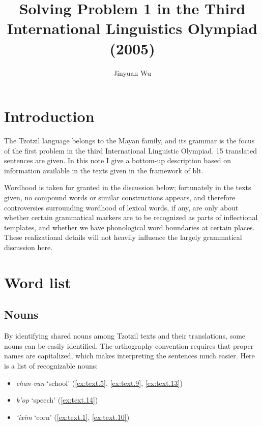 \documentclass[12pt]{article}
\title{Solving Problem 1 in the Third International Linguistics Olympiad (2005)}
\author{Jinyuan Wu}
\newcommand*{\form}[1]{\emph{#1}}
\newcommand{\translate}[1]{`#1'}
\begin{document}
\automath

\maketitle

\section{Introduction}

The Tzotzil language belongs to the Mayan family,
and its grammar is the focus of the first problem 
in the third International Linguistic Olympiad.
15 translated sentences are given.
In this note I give a bottom-up description 
based on information available in the texts given
in the framework of \ac{blt}.

Wordhood is taken for granted in the discussion below;
fortunately in the texts given,
no compound words or similar constructions appears, 
and therefore controversies surrounding wordhood of lexical words, 
if any, are only about whether certain grammatical markers 
are to be recognized as parts of inflectional templates,
and whether we have phonological word boundaries at certain places.
These realizational details will not heavily influence the largely grammatical discussion here. 

\section{Word list}

\subsection{Nouns}

By identifying shared nouns among Tzotzil texts and their translations,
some nouns can be easily identified.
The orthography convention 
requires that proper names are capitalized,
which makes interpreting the sentences much easier.
Here is a list of recognizable nouns:
\begin{itemize}
    \item \form{chan-vun} \translate{school} (\ref{ex:text.5}, \ref{ex:text.9}, \ref{ex:text.13})
    \item \form{k'op} \translate{speech} (\ref{ex:text.14})
    \item \form{`ixim} \translate{corn} (\ref{ex:text.1}, \ref{ex:text.10}) 
\end{itemize}
\end{document}
